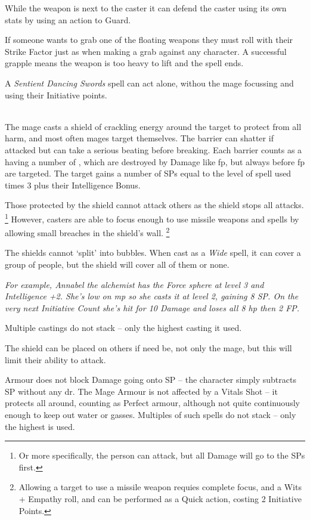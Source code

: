 \begin{multicols}{2}
While the weapon is next to the caster it can defend the caster using its own stats by using an action to Guard.

If someone wants to grab one of the floating weapons they must roll with their Strike Factor just as when making a grab against any character.
A successful grapple means the weapon is too heavy to lift and the spell ends.

A \textit{Sentient Dancing Swords} spell can act alone, withou the mage focussing and using their Initiative points.

\\
The mage casts a shield of crackling energy around the target to protect from all harm, and most often mages target themselves.
The barrier can shatter if attacked but can take a serious beating before breaking.
Each barrier counts as a having a number of , which are destroyed by Damage like \gls{fp}, but always before \gls{fp} are targeted.
The target gains a number of \glspl{SP} equal to the level of spell used times 3 plus their Intelligence Bonus.

Those protected by the shield cannot attack others as the shield stops all attacks.%
\footnote{Or more specifically, the person can attack, but all Damage will go to the \glspl{SP} first.}
However, casters are able to focus enough to use missile weapons and spells by allowing small breaches in the shield's wall.
\footnote{Allowing a target to use a missile weapon requies complete focus, and a Wits + Empathy roll, and can be performed as a Quick action, costing 2 Initiative Points.}

The shields cannot `split' into bubbles.
When cast as a \textit{Wide} spell, it can cover a group of people, but the shield will cover all of them or none.

\textit{For example, Annabel the alchemist has the Force sphere at level 3 and Intelligence +2.
She's low on \gls{mp} so she casts it at level 2, gaining 8 \gls{SP}.
On the very next Initiative Count she's hit for 10 Damage and loses all 8 \gls{hp} then 2 FP.}

Multiple castings do not stack -- only the highest casting it used.

The shield can be placed on others if need be, not only the mage, but this will limit their ability to attack.

Armour does not block Damage going onto \gls{SP} -- the character simply subtracts \gls{SP} without any \gls{dr}. The Mage Armour is not affected by a Vitals Shot -- it protects all around, counting as Perfect armour, although not quite continuously enough to keep out water or gasses. Multiples of such spells do not stack -- only the highest is used.


\end{multicols}

